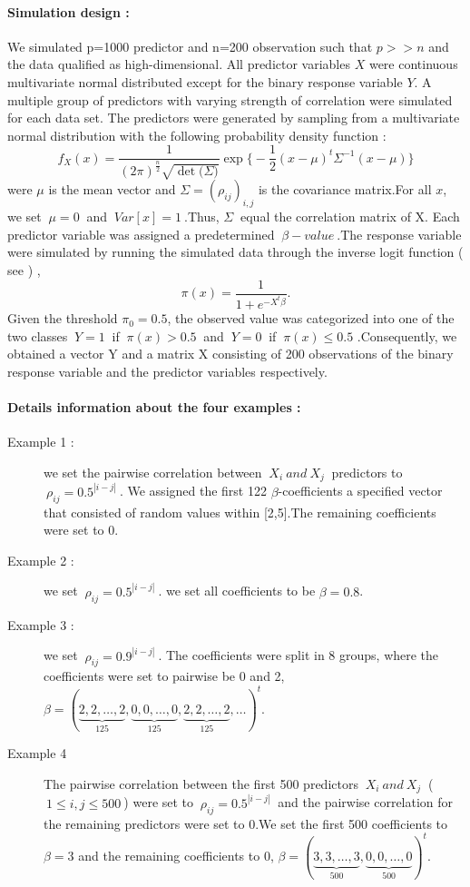 \documentclass[12pt]{report}
\begin{document}
{	\paragraph{Simulation design :}
	We simulated p=1000 predictor and n=200 observation such that $p>>n$ and the data qualified as high-dimensional. All predictor variables $X$ were continuous multivariate normal distributed except for the binary response variable $Y$. A multiple group of predictors with varying strength of correlation were simulated for each data set. The predictors were generated by sampling from a multivariate normal distribution with the following probability density function :
	$$ f_{X}(x)=\frac{1}{(2\pi)^{\frac{n}{2}} \sqrt{\det\big(\Sigma\big)}}\exp\bigg\{-\frac{1}{2}(x-\mu)^{t}\Sigma^{-1}(x-\mu)\bigg\}$$  
	were $\mu$ is the mean vector and $\Sigma=(\rho_{ij})_{i,j}$  is the covariance matrix.For all $x$, we set $\ \mu=0\ $ and $\ Var[x]=1\ $.Thus, $\Sigma\ $ equal the correlation matrix of X. Each predictor variable was assigned a predetermined $\ \beta-value\ $.The response variable were simulated by running the simulated data through the inverse logit function ( see \cite{nref29}) ,
	$$\pi(x)=\frac{1}{1+e^{-X^{t}\beta}}.$$
	Given the threshold $\pi_{0}=0.5$, the observed value was categorized into one of the two classes $\ Y=1\ $ if $\ \pi(x)>0.5\ $ and $\ Y=0\ $ if $\ \pi(x)\leq0.5$ .Consequently, we obtained a vector Y and a matrix X consisting of 200 observations of the binary response variable and the predictor variables respectively.
	\paragraph{Details information about the four examples :}
	\begin{description}
		\item[Example 1 :] we set the pairwise correlation between $\ X_{i}\ and\ X_{j}\ $ predictors to $\ \rho_{ij}=0.5^{|i-j|}\ $. We assigned the first 122 $\beta$-coefficients a specified vector that consisted of random values within [2,5].The remaining coefficients were set to 0.
		\item[Example 2 :] we set $\ \rho_{ij}=0.5^{|i-j|}\ $. we set all coefficients to be $\beta=0.8$.
		\item[Example 3 :] we set $\ \rho_{ij}=0.9^{|i-j|}\ $. The coefficients were split in 8 groups, where the coefficients were set to pairwise be 0 and 2, $\beta=(\underbrace{2,2,\dots,2}_{125},\underbrace{0,0,\dots,0}_{125},\underbrace{2,2,\dots,2}_{125},\dots)^{t}$.
		\item[Example 4] The pairwise correlation between the first 500 predictors $\ X_{i}\ and\ X_{j}\ $ ( $\ 1\leq i,j \leq 500\ $) were set to $\ \rho_{ij}=0.5^{|i-j|}\ $ and the pairwise correlation for the remaining predictors were set to 0.We set the first 500 coefficients to $ \beta=3 $ and the remaining coefficients to 0, $\beta=(\underbrace{3,3,\dots,3}_{500},\underbrace{0,0,\dots,0}_{500})^{t}$.
\end{description} }
\end{document}
